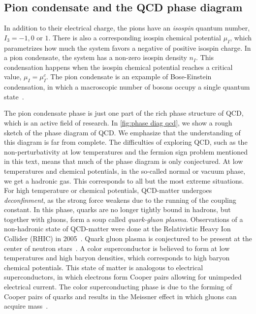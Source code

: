 \subsection*{Pion condensate and the QCD phase diagram}

In addition to their electrical charge, the pions have an \emph{isospin} quantum number, $I_3 = -1, 0$ or $1$.
There is also a corresponding isospin chemical potential $\mu_I$, which parametrizes how much the system favors a negative of positive isospin charge.
In a pion condensate, the system has a non-zero isospin density $n_I$.
This condensation happens when the isospin chemical potential reaches a critical value, $\mu_I = \mu_I^c$.
The pion condensate is an expample of Bose-Einstein condensation, in which a macroscopic number of bosons occupy a single quantum state~\cite{Brandt:QCD_phase_diagram_with_isospin_chemical_potential,Brandt:QCD_phase_diagram_for_nonzero_isospin-asymmetry}.

The pion condensate phase is just one part of the rich phase structure of QCD, which is an active field of research.
In \autoref{fig:phase diag qcd}, we show a rough sketch of the phase diagram of QCD.
We emphasize that the understanding of this diagram is far from complete.
The difficulties of exploring QCD, such as the non-perturbativity at low temperatures and the fermion sign problem mentioned in this text, means that much of the phase diagram is only conjectured.
At low temperatures and chemical potentials, in the so-called normal or vacuum phase, we get a hadronic gas.
This corresponds to all but the most extreme situations.
For high temperature or chemical potentials, QCD-matter undergoes \emph{deconfinment}, as the strong force weakens due to the running of the coupling constant.
In this phase, quarks are no longer tightly bound in hadrons, but together with gluons, form a soup called \emph{quark-gluon plasma}.
Observations of a non-hadronic state of QCD-matter were done at the Relativistic Heavy Ion Collider (RHIC) in 2005~\cite{2005:RHIC,2005:RHIC2}.
Quark gluon plasma is conjectured to be present at the center of neutron stars~\cite{from_hadrons_to_quarks}.
A color superconductor is believed to form at low temperatures and high baryon densities, which corresponds to high baryon chemical potentials.
This state of matter is analogous to electrical superconductors, in which electrons form Cooper pairs allowing for unimpeded electrical current.
The color superconducting phase is due to the forming of Cooper pairs of quarks and results in the Meissner effect in which gluons can acquire mass~\cite{alford:color_superconductivity}.

